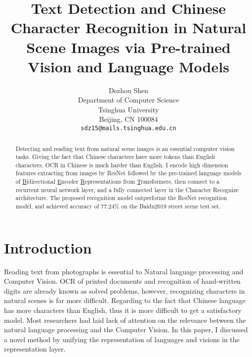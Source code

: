 \documentclass[review]{cvpr}
\begin{document}
\title{Text Detection and Chinese Character Recognition in Natural Scene Images via Pre-trained Vision and Language Models}

\author{Dezhou Shen\\
Department of Computer Science\\
Tsinghua University\\
Beijing, CN 100084\\
{\tt\small sdz15@mails.tsinghua.edu.cn}
}

\maketitle


\begin{abstract}

  Detecting and reading text from natural scene images is an essential computer vision tasks.
  Giving the fact that Chinese characters have more tokens than English characters, OCR in Chinese is much harder than English.
  I encode high dimension features extracting from images by ResNet followed by the pre-trained language models of
  \underline{B}idirectional \underline{E}ncoder \underline{R}epresentations from \underline{T}ransformers,
  then connect to a recurrent neural network layer, and a fully connected layer in the Character Recognize architecture.
  The proposed recognition model outperforms the ResNet recognition model, and achieved accuracy of $77.24\%$ on the Baidu2019 street scene test set.

\end{abstract}

\section{Introduction}

  Reading text from photographs is essential to Natural language processing and Computer Vision.
  OCR of printed documents and recognition of hand-written digits are already known as solved problems,
  however, recognizing characters in natural scenes is far more difficult.
  Regarding to the fact that Chinese language has more characters than English, thus it is more difficult to get a satisfactory model.
  Most researchers had laid lack of attention on the relevance between the natural language processing and the Computer Vision.
  In this paper, I discussed a novel method by unifying the representation of languages and visions in the representation layer.
\end{document}
